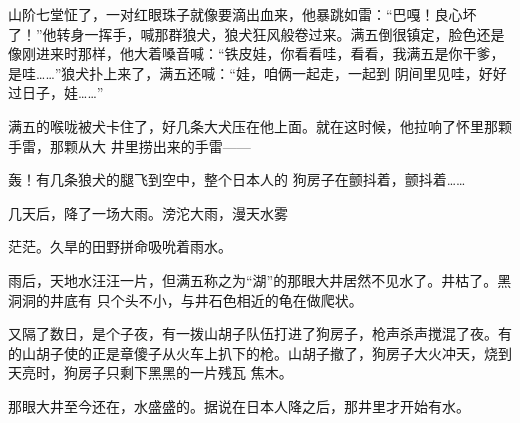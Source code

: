 \documentclass{article}
\begin{document}
山阶七堂怔了，一对红眼珠子就像要滴出血来，他暴跳如雷：“巴嘎！良心坏了！”他转身一挥手，喊那群狼犬，狼犬狂风般卷过来。满五倒很镇定，脸色还是像刚进来时那样，他大着嗓音喊：“铁皮娃，你看看哇，看看，我满五是你干爹，是哇……”狼犬扑上来了，满五还喊：“娃，咱俩一起走，一起到
阴间里见哇，好好过日子，娃……” 

满五的喉咙被犬卡住了，好几条大犬压在他上面。就在这时候，他拉响了怀里那颗手雷，那颗从大
井里捞出来的手雷—— 

轰！有几条狼犬的腿飞到空中，整个日本人的
狗房子在颤抖着，颤抖着…… 

几天后，降了一场大雨。滂沱大雨，漫天水雾

\newpage
茫茫。久旱的田野拼命吸吮着雨水。 

雨后，天地水汪汪一片，但满五称之为“湖”的那眼大井居然不见水了。井枯了。黑洞洞的井底有
只个头不小，与井石色相近的龟在做爬状。 

又隔了数日，是个子夜，有一拨山胡子队伍打进了狗房子，枪声杀声搅混了夜。有的山胡子使的正是章傻子从火车上扒下的枪。山胡子撤了，狗房子大火冲天，烧到天亮时，狗房子只剩下黑黑的一片残瓦
焦木。 

那眼大井至今还在，水盛盛的。据说在日本人降之后，那井里才开始有水。
\end{document}
